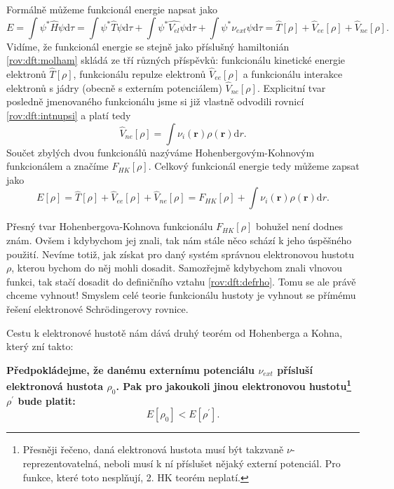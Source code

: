 \bigskip
Formálně můžeme funkcionál energie napsat jako
\begin{equation}
E=\int \psi^*\hat{H}\psi \mathrm{d}\tau = \int \psi^*\hat{T}\psi\mathrm{d}\tau + \int \psi^*\hat{V_{el}}\psi\mathrm{d}\tau + \int \psi^*\nu_{ext}\psi\mathrm{d}\tau=\hat{T}[\rho]+\hat{V}_{ee}[\rho]+\hat{V}_{ne}[\rho] .
\end{equation}
Vidíme, že funkcionál energie se stejně jako příslušný hamiltonián \eqref{rov:dft:molham} skládá ze tří různých příspěvků: funkcionálu kinetické energie elektronů $\hat{T}[\rho]$, funkcionálu repulze elektronů $\hat{V}_{ee}[\rho]$ a funkcionálu interakce elektronů s jádry (obecně s externím potenciálem) $\hat{V}_{ne}[\rho]$. 
Explicitní tvar posledně jmenovaného funkcionálu jsme si již vlastně odvodili rovnicí \eqref{rov:dft:intnupsi} a platí tedy
\begin{equation}
\hat{V}_{ne}[\rho] = \int \nu_i(\textbf{r})\rho(\textbf{r}) \mathrm{d}r .
\end{equation}
Součet zbylých dvou funkcionálů nazýváme Hohenbergovým-Kohnovým funkcionálem a značíme $F_{HK}[\rho]$. 
Celkový funkcionál energie tedy můžeme zapsat jako
\begin{equation}
E[\rho] = \hat{T}[\rho]+\hat{V}_{ee}[\rho]+\hat{V}_{ne}[\rho] = F_{HK}[\rho] + \int \nu_i(\mathbf{r})\rho(\textbf{r}) \mathrm{d}r .
\end{equation}

Přesný tvar Hohenbergova-Kohnova funkcionálu $F_{HK}[\rho]$ bohužel není dodnes znám. 
Ovšem i kdybychom jej znali, tak nám stále něco schází k jeho úspěšného použití. Nevíme totiž, jak získat pro daný systém správnou elektronovou hustotu $\rho$, kterou bychom do něj mohli dosadit. Samozřejmě kdybychom znali vlnovou funkci, tak stačí dosadit do definičního vztahu \eqref{rov:dft:defrho}. Tomu se ale právě chceme vyhnout! Smyslem celé teorie funkcionálu hustoty je vyhnout se přímému řešení elektronové Schr\"{o}dingerovy rovnice.

Cestu k elektronové hustotě nám dává druhý teorém od Hohenberga a Kohna, který zní takto:

\bigskip
\textbf{Předpokládejme, že danému externímu potenciálu $\nu_{ext}$ přísluší elektronová hustota $\rho_0$. Pak pro jakoukoli jinou elektronovou hustotu\footnote{Přesněji řečeno, daná elektronová hustota musí být takzvaně $\nu$-{reprezentovatelná}, neboli musí k ní příslušet nějaký externí potenciál. Pro funkce, které toto nesplňují, 2. HK teorém neplatí.} $\rho^{\prime}$ bude platit:}
\begin{equation}
E[\rho_0] < E[\rho^{\prime}] .
\label{rov:dft:HK2}
\end{equation}

